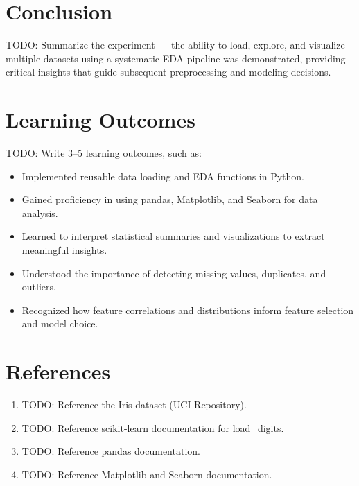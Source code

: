 \documentclass[12pt,a4paper]{article}
\begin{document}
\section{Conclusion}
TODO: Summarize the experiment — the ability to load, explore, and visualize multiple datasets using a systematic EDA pipeline was demonstrated, providing critical insights that guide subsequent preprocessing and modeling decisions.

\section{Learning Outcomes}
TODO: Write 3–5 learning outcomes, such as:

\begin{itemize}
    \item Implemented reusable data loading and EDA functions in Python.
    \item Gained proficiency in using pandas, Matplotlib, and Seaborn for data analysis.
    \item Learned to interpret statistical summaries and visualizations to extract meaningful insights.
    \item Understood the importance of detecting missing values, duplicates, and outliers.
    \item Recognized how feature correlations and distributions inform feature selection and model choice.
\end{itemize}

\section{References}
\begin{enumerate}
    \item TODO: Reference the Iris dataset (UCI Repository).
    \item TODO: Reference scikit-learn documentation for load\_digits.
    \item TODO: Reference pandas documentation.
    \item TODO: Reference Matplotlib and Seaborn documentation.
\end{enumerate}
\end{document}

